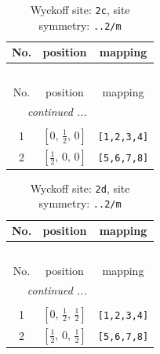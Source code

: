 \documentclass[fleqn,8pt]{jsarticle}
\begin{document}
\renewcommand{\arraystretch}{1.2}
\begin{longtable}{ccc}
\caption{Wyckoff site: {\tt 2c}, site symmetry: {\tt ..2/m}}
 \\
 \hline \hline
No. & position & mapping \\ \hline \endfirsthead

\multicolumn{2}{l}{\tablename\ \thetable{}} \\
 \hline \hline
No. & position & mapping \\ \hline \endhead

 \hline \hline
\multicolumn{2}{r}{\footnotesize\it continued ...} \\ \endfoot

 \hline \hline
\multicolumn{2}{r}{} \\ \endlastfoot

1 & $\left[ 0,\, \frac{1}{2},\, 0 \right]$ & {\tt [1,2,3,4]} \\ \hline
2 & $\left[ \frac{1}{2},\, 0,\, 0 \right]$ & {\tt [5,6,7,8]} \\
\end{longtable}
\renewcommand{\arraystretch}{1.2}
\begin{longtable}{ccc}
\caption{Wyckoff site: {\tt 2d}, site symmetry: {\tt ..2/m}}
 \\
 \hline \hline
No. & position & mapping \\ \hline \endfirsthead

\multicolumn{2}{l}{\tablename\ \thetable{}} \\
 \hline \hline
No. & position & mapping \\ \hline \endhead

 \hline \hline
\multicolumn{2}{r}{\footnotesize\it continued ...} \\ \endfoot

 \hline \hline
\multicolumn{2}{r}{} \\ \endlastfoot

1 & $\left[ 0,\, \frac{1}{2},\, \frac{1}{2} \right]$ & {\tt [1,2,3,4]} \\ \hline
2 & $\left[ \frac{1}{2},\, 0,\, \frac{1}{2} \right]$ & {\tt [5,6,7,8]} \\
\end{longtable}
\renewcommand{\arraystretch}{1.2}
\end{document}
